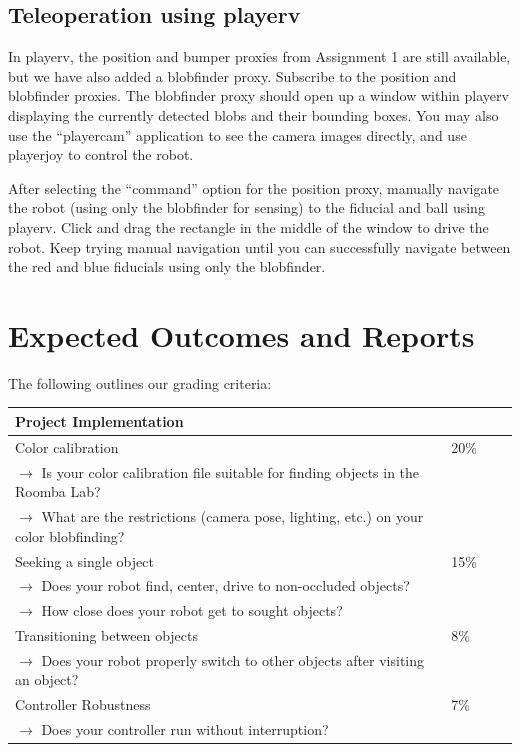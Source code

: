 \subsection{Teleoperation using playerv}

In playerv, the position and bumper proxies from Assignment 1 are still available, but we have also added a blobfinder proxy.  
Subscribe to the position and blobfinder proxies.  The blobfinder proxy should open up a window within playerv displaying the currently 
detected blobs and their bounding boxes.  You may also use the ``playercam'' application to see the camera images directly, and use 
playerjoy to control the robot.  

After selecting the ``command'' option for the position proxy, manually navigate the robot (using only the blobfinder for sensing) to 
the fiducial and ball using playerv.  Click and drag the rectangle in the middle of the window to drive the robot.  Keep trying manual 
navigation until you can successfully navigate between the red and blue fiducials using only the blobfinder.

\section{Expected Outcomes and Reports}

The following outlines our grading criteria:

\vspace{1cm}
\begin{tabular}{|l|l||l|l|}
\hline
{\large \bf Project Implementation} & \\
\hline
\hline
Color calibration & 20\% \\
$\rightarrow$ Is your color calibration file suitable for finding objects in the Roomba Lab? & \\
$\rightarrow$ What are the restrictions (camera pose, lighting, etc.) on your color blobfinding? & \\
\hline
Seeking a single object & 15\% \\
$\rightarrow$ Does your robot find, center, drive to non-occluded objects? & \\
$\rightarrow$ How close does your robot get to sought objects? & \\
\hline
Transitioning between objects & 8\% \\
$\rightarrow$ Does your robot properly switch to other objects after visiting an object? & \\
\hline
Controller Robustness & 7\% \\
$\rightarrow$ Does your controller run without interruption? & \\
\hline
\end{tabular}

\newpage

